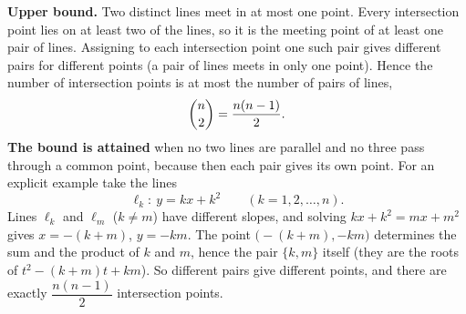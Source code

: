 \textbf{Upper bound.} Two distinct lines meet in at most one point. Every intersection point lies on at least two of the lines, so it is the meeting point of at least one pair of lines. Assigning to each intersection point one such pair gives different pairs for different points (a pair of lines meets in only one point). Hence the number of intersection points is at most the number of pairs of lines,
\[
\dbinom{n}{2}=\dfrac{n(n-1)}{2}.
\]
\textbf{The bound is attained} when no two lines are parallel and no three pass through a common point, because then each pair gives its own point. For an explicit example take the lines
\[
\ell_k:\ y=kx+k^2\qquad(k=1,2,\dots,n).
\]
Lines $\ell_k$ and $\ell_m$ ($k\ne m$) have different slopes, and solving $kx+k^2=mx+m^2$ gives $x=-(k+m)$, $y=-km$. The point $\bigl(-(k+m),-km\bigr)$ determines the sum and the product of $k$ and $m$, hence the pair $\{k,m\}$ itself (they are the roots of $t^2-(k+m)t+km$). So different pairs give different points, and there are exactly $\dfrac{n(n-1)}{2}$ intersection points.
